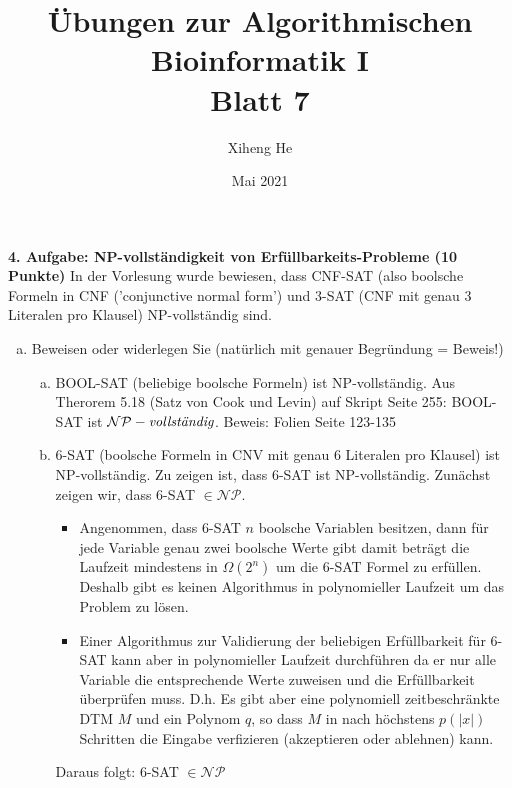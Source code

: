 \documentclass{article}
\title{Übungen zur Algorithmischen Bioinformatik I\\
Blatt 7}
\author{Xiheng He }
\date{Mai 2021}
\begin{document}
\maketitle
\begin{flushleft}
\textbf{4. Aufgabe: NP-vollständigkeit von Erfüllbarkeits-Probleme (10 Punkte)}
\newline
In der Vorlesung wurde bewiesen, dass CNF-SAT (also boolsche Formeln in CNF (’conjunctive
normal form’) und 3-SAT (CNF mit genau 3 Literalen pro Klausel) NP-vollständig sind.
\begin{enumerate}[(a)]
    \item Beweisen oder widerlegen Sie (natürlich mit genauer Begründung = Beweis!)
    \begin{enumerate}[(a)]
        \item BOOL-SAT (beliebige boolsche Formeln) ist NP-vollständig.
        \newline
        Aus Therorem 5.18 (Satz von Cook und Levin) auf Skript Seite 255: BOOL-SAT ist $\mathcal{N} \mathcal{P}-\emph{vollständig}$.
        Beweis: Folien Seite 123-135
        \item 6-SAT (boolsche Formeln in CNV mit genau 6 Literalen pro Klausel) ist NP-vollständig.
        \newline
        Zu zeigen ist, dass 6-SAT ist NP-vollständig.
        \newline
        Zunächst zeigen wir, dass 6-SAT $\in \mathcal{N} \mathcal{P}$. 
        \begin{itemize}
            \item Angenommen, dass 6-SAT $n$ boolsche Variablen besitzen, dann für jede Variable genau zwei boolsche 
            Werte gibt damit beträgt die Laufzeit mindestens in $\Omega(2^n)$ um die 6-SAT Formel zu erfüllen. 
            Deshalb gibt es keinen Algorithmus in polynomieller Laufzeit um das Problem zu lösen.
            \item Einer Algorithmus zur Validierung der beliebigen Erfüllbarkeit für 6-SAT kann aber in polynomieller
            Laufzeit durchführen da er nur alle Variable die entsprechende Werte zuweisen und die Erfüllbarkeit überprüfen muss.
            D.h. Es gibt aber eine polynomiell zeitbeschränkte DTM $M$ und ein Polynom $q$, so dass $M$ in nach höchstens 
            $p(|x|)$ Schritten die Eingabe verfizieren (akzeptieren oder ablehnen) kann.
        \end{itemize}
        Daraus folgt: 6-SAT $\in \mathcal{N} \mathcal{P}$
        \newline

\end{enumerate}
\end{enumerate}
\end{flushleft}
\end{document}
